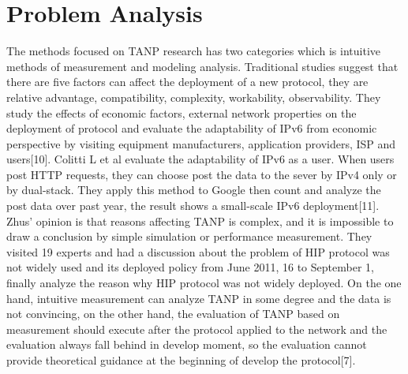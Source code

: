 \documentclass{article}
\begin{document}
\section{Problem Analysis}
The methods focused on TANP research  has two categories which is  intuitive methods of measurement and  modeling analysis. Traditional studies suggest that there are five factors can affect the deployment of a new protocol, they are relative advantage, compatibility, complexity, workability, observability. They study the effects of  economic factors, external network properties on the deployment of protocol and evaluate the adaptability of IPv6 from economic perspective by visiting equipment manufacturers, application providers, ISP and users[10]. Colitti L et al evaluate the adaptability of IPv6 as a user. When users post HTTP requests, they can choose post the data to the sever by IPv4 only or by dual-stack. They apply this method to Google then count and analyze the post data over past year,  the result shows a small-scale IPv6 deployment[11]. Zhus' opinion is that reasons affecting TANP is complex, and it is impossible to draw a conclusion by simple simulation or performance measurement. They visited 19 experts and had a discussion about the problem of HIP protocol was not widely used and its deployed policy from June 2011, 16 to September 1, finally analyze the reason why HIP protocol was not widely deployed.  On the one hand, intuitive measurement can analyze TANP in some degree and the data is not convincing,  on the other hand, the evaluation of TANP based on measurement should execute after the protocol applied to the network and the evaluation always fall behind in develop moment, so the evaluation cannot provide theoretical guidance at the beginning of develop the protocol[7].
\end{document}

